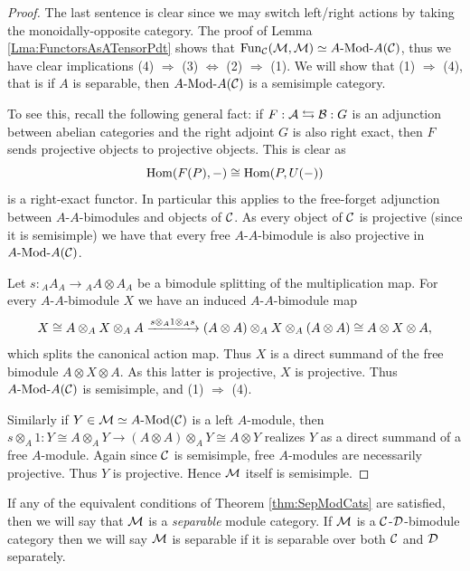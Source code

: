 \documentclass{amsart}
\begin{document}
\begin{proof}
	The last sentence is clear since we may switch left/right actions by taking the monoidally-opposite category.
	The proof of Lemma \ref{Lma:FunctorsAsATensorPdt} shows that $\Fun_\cC(\cM, \cM) \simeq \Mod{A}{A}(\cC)$, thus we have clear implications (4) $\Rightarrow$ (3) $\Leftrightarrow$ (2) $\Rightarrow$ (1). We will show that (1) $\Rightarrow$ (4), that is if $A$ is separable, then $\Mod{A}{A}(\cC)$ is a semisimple category. 
	
	To see this, recall the following general fact: if $F: \mathcal A \leftrightarrows \mathcal B: G$ is an adjunction between abelian categories and the right adjoint $G$ is also right exact, then $F$ sends projective objects to projective objects. This is clear as
	\begin{equation*}
		\operatorname{Hom}(F(P), -) \cong \operatorname{Hom}(P, U(-))
	\end{equation*}
	is a right-exact functor. In particular this applies to the free-forget adjunction between $A$-$A$-bimodules and objects of $\mathcal C$. As every object of $\mathcal C$ is projective (since it is semisimple) we have that every free $A$-$A$-bimodule is also projective in $\Mod{A}{A}(\cC)$. 
	
Let $s: {}_AA_A \to {}_AA \otimes A_A$ be a bimodule splitting of the multiplication map. For every $A$-$A$-bimodule $X$ we have an induced $A$-$A$-bimodule map
\begin{equation*}
	X \cong A \otimes_A X \otimes_A A 
	\xrightarrow{s \otimes_A 1 \otimes_A s} (A \otimes A) \otimes_A X \otimes_A (A \otimes A) \cong A \otimes X \otimes A,
\end{equation*}  	
which splits the canonical action map. Thus $X$ is a direct summand of the free bimodule $A \otimes X \otimes A$. As this latter is projective, $X$ is projective. Thus $\Mod{A}{A}(\cC)$ is semisimple, and (1) $\Rightarrow$ (4). 
	
Similarly if $Y \in \cM \simeq \Mod{A}{}(\cC)$ is a left $A$-module, then $s \otimes_A 1: Y \cong A \otimes_A Y \to (A \otimes A) \otimes_A Y \cong A \otimes Y$ realizes $Y$ as a direct summand of a free $A$-module. Again since $\mathcal C$ is semisimple, free $A$-modules are necessarily projective. Thus $Y$ is projective. Hence $\mathcal M$ itself is semisimple.  	
\end{proof}

\begin{definition}
	If any of the equivalent conditions of Theorem \ref{thm:SepModCats} are satisfied, then we will say that $\mathcal M$ is a {\em separable} module category. If $\mathcal M$ is a $\mathcal C$-$\mathcal D$-bimodule category then we will say $\mathcal M$ is separable if it is separable over both $\mathcal C$ and $\mathcal D$ separately. 
\end{definition}
\end{document}
